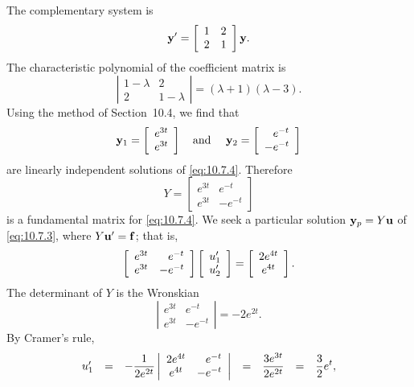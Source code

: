 \begin{examplesolution}
 The complementary system is
\begin{equation}
  \label{eq:10.7.4}{\bf y}'=\left[\begin{array}{rr} 1&2\\2&1\end{array}\right]{\bf y}.
\end{equation}
The characteristic polynomial of the coefficient matrix is
\[
  \left|
  \begin{array}{cc}
    1-\lambda & 2         \\
    2         & 1-\lambda
  \end{array}\right|= (\lambda+1)(\lambda-3).
\]
Using the method of Section~10.4, we find that
\[
  {\bf y}_{1}=\left[
  \begin{array}{r}
    e^{3t} \\
    e^{3t}
  \end{array}\right] \mbox{\quad and \quad}{\bf y}_{2}=\left[
  \begin{array}{r}
    e^{-t}  \\
    -e^{-t}
  \end{array}\right]
\]
are linearly independent solutions of \eqref{eq:10.7.4}. Therefore
\[
  Y=\left[
  \begin{array}{rr}
    e^{3t} & e^{-t}  \\
    e^{3t} & -e^{-t}
  \end{array}\right]
\]
is a fundamental matrix for \eqref{eq:10.7.4}. We seek a particular solution ${\bf y}_{p}=Y{\bf u}$
of \eqref{eq:10.7.3}, where $Y{\bf u}'={\bf f}$; that is,
\[
  \left[
  \begin{array}{rr}
    e^{3t} & e^{-t}  \\
    e^{3t} & -e^{-t}
  \end{array}\right] \left[\begin{array}{l}u_{1}'\\u_{2}'\end{array}\right]=\left[
  \begin{array}{c}
    2e^{4t} \\
    e^{4t}
  \end{array}\right].
\]
The determinant of $Y$ is the Wronskian
\[
  \left|
  \begin{array}{rr}
    e^{3t} & e^{-t}  \\
    e^{3t} & -e^{-t}
  \end{array}\right| =-2e^{2t}.
\]
By Cramer's rule,
\[
  \begin{array}{ccccccl}
    u_{1}' & = & -\displaystyle\frac{1}{2e^{2t}} \left|\begin{array}{cr}2e^{4t}&e^{-t}\\e^{4t}&-e^{-t}\end{array}\right| & = & \displaystyle\frac{3e^{3t}}{2e^{2t}} & = & \displaystyle\frac{3}{2}e^{t},  \\[4\jot]

\end{array}\]
\end{examplesolution}
